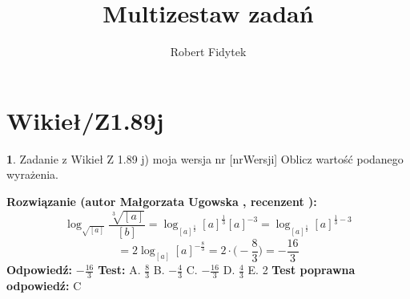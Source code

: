 \documentclass[12pt, a4paper]{article}
\title{Multizestaw zadań}
\author{Robert Fidytek}
\date{}
\theoremstyle{definition} %
\newtheorem{zad}{}
\newcommand{\kategoria}[1]{\section{#1}} %
\newcommand{\zadStart}[1]{\begin{zad}#1\newline} %
\newcommand{\zadStop}{\end{zad}}   %
\newcommand{\rozwStart}[2]{\noindent \textbf{Rozwiązanie (autor #1 , recenzent #2): }\newline} %
\newcommand{\rozwStop}{\newline}                                            %
\newcommand{\odpStart}{\noindent \textbf{Odpowiedź:}\newline}    %
\newcommand{\odpStop}{\newline}                                             %
\newcommand{\testStart}{\noindent \textbf{Test:}\newline} %
\newcommand{\testStop}{\newline} %
\newcommand{\kluczStart}{\noindent \textbf{Test poprawna odpowiedź:}\newline} %
\newcommand{\kluczStop}{\newline} %
\begin{document}
\maketitle


\kategoria{Wikieł/Z1.89j}
\zadStart{Zadanie z Wikieł Z 1.89 j) moja wersja nr [nrWersji]}
Oblicz warto\'sć podanego wyrażenia.
\zadStop
\rozwStart{Małgorzata Ugowska}{}
$$\log_{\sqrt{[a]}}{\frac{\sqrt[3]{[a]}}{[b]}} = \log_{[a]^{\frac{1}{2}}}{[a]^{\frac{1}{3}}[a]^{-3}} = \log_{[a]^{\frac{1}{2}}}{[a]^{\frac{1}{3}-3}}$$
$$= 2 \log_{[a]}{[a]^{-\frac{8}{3}}} = 2 \cdot \big(-\frac{8}{3}\big) = -\frac{16}{3}$$
\rozwStop
\odpStart
$-\frac{16}{3}$
\odpStop
\testStart
A. $\frac{8}{3}$
B. $-\frac{4}{3}$
C. $-\frac{16}{3}$
D. $\frac{4}{3}$
E. 2
\testStop
\kluczStart
C
\kluczStop
\end{document}
